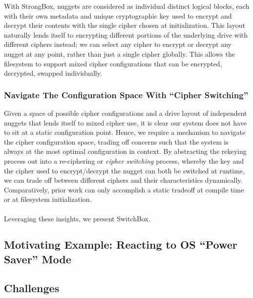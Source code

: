 With StrongBox, nuggets are considered as individual distinct logical blocks,
each with their own metadata and unique cryptographic key used to encrypt and
decrypt their contents with the single cipher chosen at initialization. This
layout naturally lends itself to encrypting different portions of the underlying
drive with different ciphers instead; we can select any cipher to encrypt or
decrypt any nugget at any point, rather than just a single cipher globally. This
allows the filesystem to support mixed cipher configurations that can be
encrypted, decrypted, swapped individually.

\subsubsection{Navigate The Configuration Space With ``Cipher Switching''}

Given a space of possible cipher configurations and a drive layout of
independent nuggets that lends itself to mixed cipher use, it is clear our
system does not have to sit at a static configuration point. Hence, we require a
mechanism to navigate the cipher configuration space, trading off concerns such
that the system is always at the most optimal configuration in context. By
abstracting the rekeying process out into a re-ciphering or \emph{cipher
switching} process, whereby the key and the cipher used to encrypt/decrypt the
nugget can both be switched at runtime, we can trade off between different
ciphers and their characteristics dynamically. Comparatively, prior work can
only accomplish a static tradeoff at compile time or at filesystem
initialization.
\\
\\
Leveraging these insights, we present SwitchBox. 

\subsection{Motivating Example: Reacting to OS ``Power Saver'' Mode}


\subsection{Challenges}

